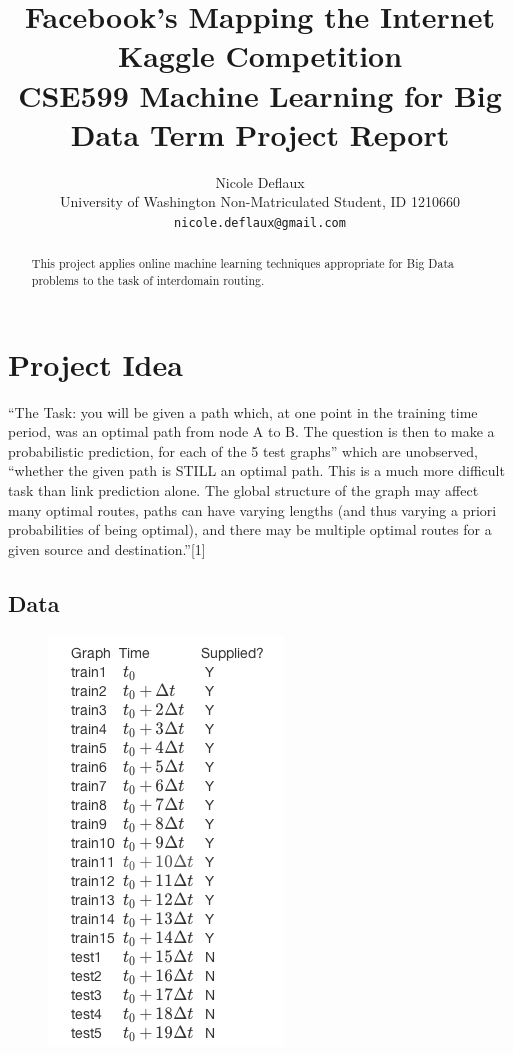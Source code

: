 \documentclass{article} %
\title{Facebook's Mapping the Internet Kaggle Competition \\
{\small CSE599 Machine Learning for Big Data Term Project Report}}
\author{Nicole Deflaux \\
University of Washington Non-Matriculated Student, ID 1210660 \\
\texttt{nicole.deflaux@gmail.com}
}
\begin{document}
\maketitle

\begin{abstract}
  This project applies online machine learning techniques appropriate for
  Big Data problems to the task of interdomain routing.
\end{abstract}

\section{Project Idea}
``The Task: you will be given a path which, at one point in the training time
period, was an optimal path from node A to B. The question is then to make a
probabilistic prediction, for each of the 5 test graphs'' which are
unobserved, ``whether the given path is STILL an optimal path.  This is a
much more difficult task than link prediction alone. The global structure of
the graph may affect many optimal routes, paths can have varying lengths
(and thus varying a priori probabilities of being optimal), and there may be
multiple optimal routes for a given source and destination.''[1]

\subsection{Data}

\begin{figure}
  \begin{center}
    \includegraphics[scale=.5]{trainAndTestGraphs.png}
  \end{center}
\end{figure}
\end{document}
